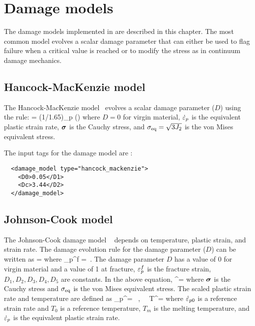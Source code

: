 \chapter{Damage models}
The damage models implemented in \Vaango are described in this chapter.  The
most common model evolves a scalar damage parameter that can either be
used to flag failure when a critical value is reached or to modify the
stress as in continuum damage mechanics.

\section{Hancock-MacKenzie model}
The Hancock-MacKenzie model~\cite{Hancock1976} evolves a scalar damage parameter ($D$)
using the rule:
\Beq
   = (1/1.65)\dot{\Veps}_p \exp\left(\frac{\Tr(\Bsig)}{2\sigma_{\Teq}}\right)
\Eeq
where $ D = 0 $ for virgin material, $ \dot{\varepsilon}_p $ is the 
equivalent plastic strain rate, $\boldsymbol{\sigma}$ is the Cauchy stress, and
$\sigma_{\text{eq}} = \sqrt{3J_2}$ is the von Mises equivalent stress.

The input tags for the damage model are :
\lstset{language=XML}
\begin{lstlisting}
  <damage_model type="hancock_mackenzie">
    <D0>0.05</D1>
    <Dc>3.44</D2>
  </damage_model>
\end{lstlisting}

\section{Johnson-Cook model}
The Johnson-Cook damage model ~\cite{Johnson1985} depends on temperature, plastic
strain, and strain rate.
The damage evolution rule for the damage parameter ($D$) can be written as
\Beq
   = 
\Eeq
where
\Beq
  \Veps_p^f = 
    \,.
\Eeq
The damage parameter $D$ has a value of 0 for virgin material
and a value of 1 at fracture, $\varepsilon_p^f$ is the fracture strain, 
$D_1, D_2, D_3, D_4, D_5$ are constants.
In the above equation,
\Beq
  \sigma^\star= \frac{\Tr(\Bsig)}{\sigma_{\Teq}}
\Eeq
where $\boldsymbol{\sigma}$ is the Cauchy stress and $\sigma_{\text{eq}}$ is the von Mises equivalent stress.
The scaled plastic strain rate and temperature are defined as
\Beq
 \dot{\Veps}_p^\star =  ~,~~
 T^\star = 
\Eeq
where $\dot{\varepsilon}_{p0}$ is a reference strain rate and $T_0$ is a reference temperature,
$T_m$ is the melting temperature, and $\dot{\varepsilon}_p$ is the equivalent plastic strain rate.

